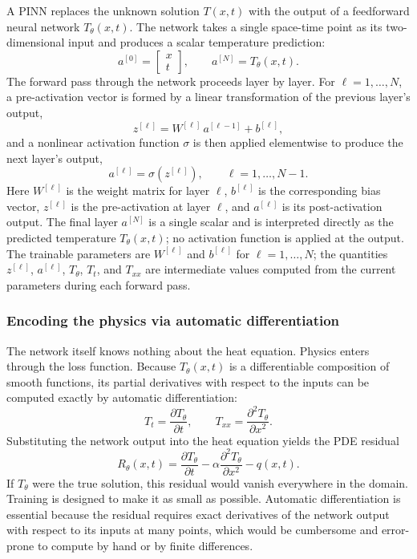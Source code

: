\documentclass[11pt,letterpaper]{article}
\begin{document}
A PINN replaces the unknown solution $T(x,t)$ with the output of a feedforward neural network
$T_\theta(x,t)$. The network takes a single space-time point as its two-dimensional input and
produces a scalar temperature prediction:
\[
a^{[0]} = \begin{bmatrix} x \\ t \end{bmatrix}, \qquad a^{[N]} = T_\theta(x,t).
\]
The forward pass through the network proceeds layer by layer. For $\ell = 1, \dots, N$, a
pre-activation vector is formed by a linear transformation of the previous layer's output,
\[
z^{[\ell]} = W^{[\ell]}\, a^{[\ell-1]} + b^{[\ell]},
\]
and a nonlinear activation function $\sigma$ is then applied elementwise to produce the next
layer's output,
\[
a^{[\ell]} = \sigma\!\left(z^{[\ell]}\right), \qquad \ell = 1, \dots, N-1.
\]
Here $W^{[\ell]}$ is the weight matrix for layer $\ell$, $b^{[\ell]}$ is the corresponding bias
vector, $z^{[\ell]}$ is the pre-activation at layer $\ell$, and $a^{[\ell]}$ is its post-activation
output. The final layer $a^{[N]}$ is a single scalar and is interpreted directly as the predicted
temperature $T_\theta(x,t)$; no activation function is applied at the output.
The trainable parameters are $W^{[\ell]}$ and $b^{[\ell]}$ for $\ell=1,\dots,N$; the quantities
$z^{[\ell]}$, $a^{[\ell]}$, $T_\theta$, $T_t$, and $T_{xx}$ are intermediate values computed from the
current parameters during each forward pass.

\subsubsection*{Encoding the physics via automatic differentiation}

The network itself knows nothing about the heat equation. Physics enters through the loss
function. Because $T_\theta(x,t)$ is a differentiable composition of smooth functions, its
partial derivatives with respect to the inputs can be computed exactly by automatic
differentiation:
\[
T_t = \frac{\partial T_\theta}{\partial t}, \qquad
T_{xx} = \frac{\partial^2 T_\theta}{\partial x^2}.
\]
Substituting the network output into the heat equation yields the PDE residual
\[
R_\theta(x,t) = \frac{\partial T_\theta}{\partial t}
- \alpha\frac{\partial^2 T_\theta}{\partial x^2} - q(x,t).
\]
If $T_\theta$ were the true solution, this residual would vanish everywhere in the domain.
Training is designed to make it as small as possible.
Automatic differentiation is essential because the residual requires exact derivatives of the
network output with respect to its inputs at many points, which would be cumbersome and error-prone
to compute by hand or by finite differences.
\end{document}
